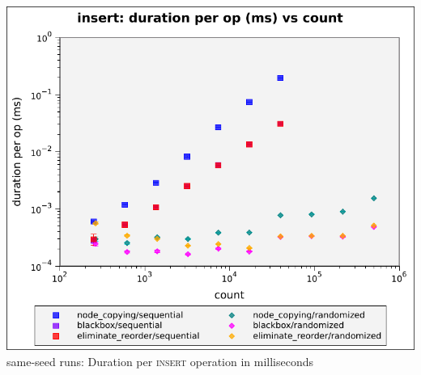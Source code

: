 \documentclass[compress]{beamer}
\begin{document}
\begin{frame}
\begin{multicols}{2}
      \includegraphics[height=0.55\textheight]{figures/graphs/insert-duration-per-op-vs-count.pdf}
       same-seed runs: Duration per \textsc{insert} operation in milliseconds\vphantom{ --- only head node}
      \newline \phantom{ --- only head node}
\end{multicols}
\end{frame}
\end{document}
